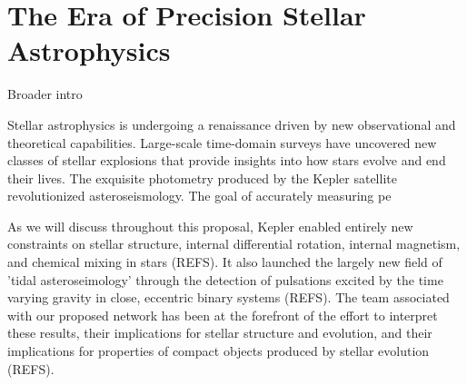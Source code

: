 \section{The Era of Precision Stellar Astrophysics}
Broader intro

Stellar astrophysics is undergoing a renaissance driven by new observational and theoretical capabilities.   Large-scale time-domain surveys have uncovered new classes of stellar explosions that provide insights into how stars evolve and end their lives.  The exquisite photometry produced by the Kepler satellite revolutionized asteroseismology.  The goal of accurately measuring pe 

As we will discuss throughout this proposal, Kepler enabled entirely new constraints on stellar structure, internal differential rotation, internal magnetism, and chemical mixing in stars (REFS).  It also launched the largely new field of 'tidal asteroseimology' through the detection of pulsations excited by the time varying gravity in close, eccentric binary systems (REFS). The team associated with our proposed network has been at the forefront of the effort to interpret these results, their implications for stellar structure and evolution, and their implications for properties of compact objects produced by stellar evolution (REFS).   

